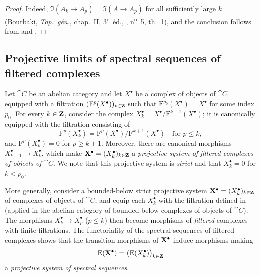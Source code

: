 \begin{proof}
Indeed, $\Im(A_k\longrightarrow A_p)
=
\Im(A\longrightarrow A_p)$
for all sufficiently large $k$
(Bourbaki, \emph{Top.\ g\'{e}n.}, chap.~II,
3\textsuperscript{e}~\'{e}d., ,
n\textsuperscript{o}~5, th.~1), and the conclusion follows from
 and .
\end{proof}

\subsection{Projective limits of spectral sequences of filtered complexes}
\label{subsection:0.13.5}

\begin{env}[13.5.1]
\label{0.13.5.1}
Let $\cat{C}$ be an abelian category and let $X^\bullet$ be a complex
of objects of $\cat{C}$ equipped with a filtration
$(\mathrm{F}^p(X^\bullet))_{p\in\mathbf{Z}}$ such that
$\mathrm{F}^{p_0}(X^\bullet)=X^\bullet$ for some index $p_0$.
For every $k\in\mathbf{Z}$, consider the complex $X^\bullet_k=X^\bullet/\mathrm{F}^{k+1}(X^\bullet)$;
it is canonically equipped with the filtration consisting of
\[
  \mathrm{F}^p(X^\bullet_k)
  =
  \mathrm{F}^p(X^\bullet)/\mathrm{F}^{k+1}(X^\bullet)
  \quad\text{for }p\leq k,
\]
and $\mathrm{F}^p(X^\bullet_k)=0$ for $p\geq k+1$.
Moreover, there are canonical morphisms
$X^\bullet_{k+1}\longrightarrow X^\bullet_k$, which make
$\mathbf{X}^\bullet=(X^\bullet_k)_{k\in\mathbf{Z}}$ a \emph{projective system
of filtered complexes of objects of $\cat{C}$}.
We note that this projective system is \emph{strict} and that
$X^\bullet_k=0$ for $k<p_0$.
\end{env}

\begin{env}[13.5.2]
\label{0.13.5.2}
More generally, consider a bounded-below strict projective system
$\mathbf{X}^\bullet=(X^\bullet_k)_{k\in\mathbf{Z}}$ of complexes of objects of
$\cat{C}$, and equip each $X^\bullet_k$ with the filtration defined in
 (applied in the abelian category of bounded-below
complexes of objects of $\cat{C}$).
The morphisms
$X^\bullet_k\longrightarrow X^\bullet_p$ ($p\leq k$) then become
morphisms of \emph{filtered} complexes with finite filtrations.
The functoriality of the spectral sequences of filtered complexes
 shows that the transition morphisms of
$\mathbf{X}^\bullet$ induce morphisms making
\[
  \mathrm{E}(\mathbf{X}^\bullet)
  =
  \bigl(\mathrm{E}(X^\bullet_k)\bigr)_{k\in\mathbf{Z}}
\]
a \emph{projective system of spectral sequences}.
\end{env}

